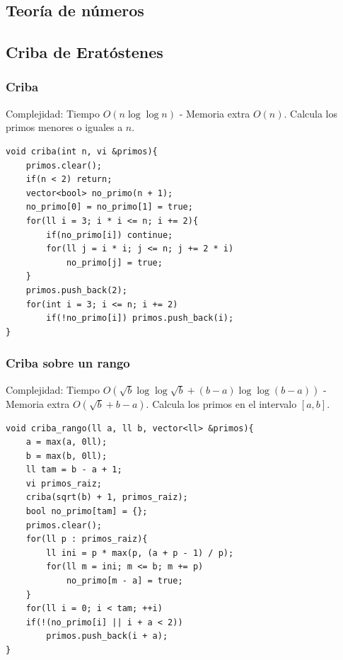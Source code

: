 \documentclass[12 pts,spanish,mexico]{article}
\numberwithin{equation}{section}
\begin{document}
\begin{multicols}{2}



\section{Teoría de números}
\subsection{Criba de Eratóstenes}
\subsubsection{Criba}
Complejidad: Tiempo $O(n\log \log n)$ - Memoria extra $O(n)$. Calcula los primos menores o iguales a $n$.
\begin{verbatim}
void criba(int n, vi &primos){
    primos.clear();
    if(n < 2) return;
    vector<bool> no_primo(n + 1);
    no_primo[0] = no_primo[1] = true;
    for(ll i = 3; i * i <= n; i += 2){
        if(no_primo[i]) continue;
        for(ll j = i * i; j <= n; j += 2 * i)
            no_primo[j] = true;
    }
    primos.push_back(2);
    for(int i = 3; i <= n; i += 2)
        if(!no_primo[i]) primos.push_back(i);
}
\end{verbatim}

\subsubsection{Criba sobre un rango}
Complejidad: Tiempo $O(\sqrt{b} \log \log \sqrt{b} + (b - a)\log \log(b - a))$ - Memoria extra $O(\sqrt{b} + b - a)$. Calcula los primos en el intervalo $[a, b]$.
\begin{verbatim}
void criba_rango(ll a, ll b, vector<ll> &primos){
    a = max(a, 0ll);
    b = max(b, 0ll);
    ll tam = b - a + 1;
    vi primos_raiz;
    criba(sqrt(b) + 1, primos_raiz);
    bool no_primo[tam] = {};
    primos.clear();
    for(ll p : primos_raiz){
        ll ini = p * max(p, (a + p - 1) / p);
        for(ll m = ini; m <= b; m += p)
            no_primo[m - a] = true;
    }
    for(ll i = 0; i < tam; ++i)
    if(!(no_primo[i] || i + a < 2))
        primos.push_back(i + a);
}
\end{verbatim}


\end{multicols}
\end{document}

